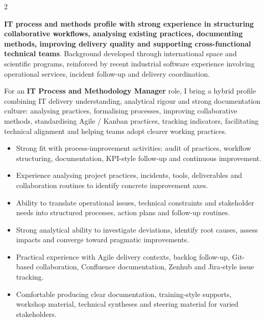 \documentclass[8pt,a4paper,ragged2e,withhyper]{altacv}
\begin{document}
\begin{paracol}{2}
\switchcolumn


\textbf{IT process and methods profile with strong experience in structuring collaborative workflows, analysing existing practices, documenting methods, improving delivery quality and supporting cross-functional technical teams}. Background developed through international space and scientific programs, reinforced by recent industrial software experience involving operational services, incident follow-up and delivery coordination.

For an \textbf{IT Process and Methodology Manager} role, I bring a hybrid profile combining IT delivery understanding, analytical rigour and strong documentation culture: analysing practices, formalising processes, improving collaborative methods, standardising Agile / Kanban practices, tracking indicators, facilitating technical alignment and helping teams adopt clearer working practices.

\begin{itemize}
  \item Strong fit with process-improvement activities: audit of practices, workflow structuring, documentation, KPI-style follow-up and continuous improvement.
  \item Experience analysing project practices, incidents, tools, deliverables and collaboration routines to identify concrete improvement axes.
  \item Ability to translate operational issues, technical constraints and stakeholder needs into structured processes, action plans and follow-up routines.
  \item Strong analytical ability to investigate deviations, identify root causes, assess impacts and converge toward pragmatic improvements.
  \item Practical experience with Agile delivery contexts, backlog follow-up, Git-based collaboration, Confluence documentation, Zenhub and Jira-style issue tracking.
  \item Comfortable producing clear documentation, training-style supports, workshop material, technical syntheses and steering material for varied stakeholders.
\end{itemize}



\end{paracol}
\end{document}
